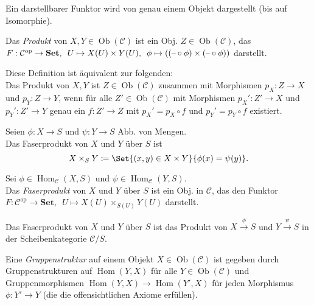 \documentclass{cheat-sheet}
\newcommand{\SetC}{\mathbf{Set}} %
\newcommand{\op}{\mathrm{op}} %
\DeclareMathOperator{\Hom}{Hom} %
\newcommand{\Cat}{\mathcal{C}} %
\DeclareMathOperator{\Ob}{Ob} %
\begin{document}
\begin{kor}
  Ein darstellbarer Funktor wird von genau einem Objekt dargestellt (bis auf Isomorphie).
\end{kor}

\begin{defn}
  Das \emph{Produkt} von $X, Y \in \Ob(\Cat)$ ist ein Obj. $Z \in \Ob(\Cat)$, das
  $F : \Cat^\op \to \SetC, \enspace U \mapsto X(U) \times Y(U), \enspace \phi \mapsto ((\blank \circ \phi) \times (\blank \circ \phi))$ darstellt.
\end{defn}

\begin{bem}
  Diese Definition ist äquivalent zur folgenden: \\
  Das Produkt von $X, Y$ ist $Z \in \Ob(\Cat)$ zusammen mit Morphismen
  $p_X : Z \to X$ und $p_Y : Z \to Y$,
  wenn für alle $Z' \in \Ob(\Cat)$ mit Morphismen 
  $p_X' : Z' \to X$ und $p_Y' : Z' \to Y$
  genau ein $f : Z' \to Z$ mit $p_X' = p_X \circ f$ und $p_Y' = p_Y \circ f$ existiert.
\end{bem}

\begin{defn}
  Seien $\phi : X \to S$ und $\psi : Y \to S$ Abb. von Mengen. \\
  Das Faserprodukt von $X$ und $Y$ über $S$ ist
  \[ X \times_S Y \coloneqq \Set{ (x, y) \in X \times Y }{ \phi(x) = \psi(y) }. \]
\end{defn}

\begin{defn}
  Sei $\phi \in \Hom_\Cat(X, S)$ und $\psi \in \Hom_\Cat(Y, S)$. \\
  Das \emph{Faserprodukt} von $X$ und $Y$ über $S$ ist ein Obj. in $\Cat$, das den Funktor
  $F : \Cat^\op \to \SetC, \enspace U \mapsto X(U) \times_{S(U)} Y(U)$ darstellt.
\end{defn}

\begin{bem}
  Das Faserprodukt von $X$ und $Y$ über $S$ ist das Produkt von $X \xrightarrow{\phi} S$ und $Y \xrightarrow{\psi} S$ in der Scheibenkategorie $\Cat/S$.
\end{bem}


\begin{defn}
  Eine \emph{Gruppenstruktur} auf einem Objekt $X \in \Ob(\Cat)$ ist gegeben durch Gruppenstrukturen auf $\Hom(Y, X)$ für alle $Y \in \Ob(\Cat)$ und Gruppenmorphismen $\Hom(Y, X) \to \Hom(Y', X)$ für jeden Morphismus $\phi : Y' \to Y$ (die die offensichtlichen Axiome erfüllen).
\end{defn}
\end{document}
